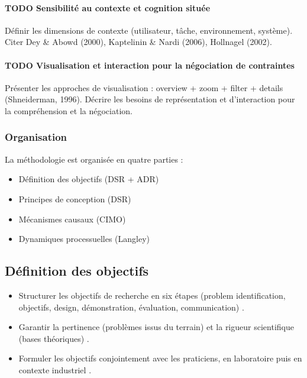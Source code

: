 \documentclass[a4paper,12pt]{article}
\begin{document}
\paragraph*{{\bfseries\sffamily TODO} Sensibilité au contexte et cognition située}
\label{sec:orgd56197d}
Définir les dimensions de contexte (utilisateur, tâche, environnement, système).  
Citer Dey \& Abowd (2000), Kaptelinin \& Nardi (2006), Hollnagel (2002).
\paragraph*{{\bfseries\sffamily TODO} Visualisation et interaction pour la négociation de contraintes}
\label{sec:orge5e48a3}
Présenter les approches de visualisation : overview + zoom + filter + details (Shneiderman, 1996).  
Décrire les besoins de représentation et d’interaction pour la compréhension et la négociation.
\subsubsection{Organisation}
\label{sec:org9f6b774}
La méthodologie est organisée en quatre parties :
\begin{itemize}
\item Définition des objectifs (DSR + ADR)
\item Principes de conception (DSR)
\item Mécanismes causaux (CIMO)
\item Dynamiques processuelles (Langley)
\end{itemize}
\subsection{Définition des objectifs}
\label{sec:orgfa7e6c6}
\begin{itemize}
\item Structurer les objectifs de recherche en six étapes (problem identification, objectifs, design, démonstration, évaluation, communication) \autocite[et al. (2007)]{Peffers}.
\item Garantir la pertinence (problèmes issus du terrain) et la rigueur scientifique (bases théoriques) \autocite[et al. (2004)]{Hevner}.
\item Formuler les objectifs conjointement avec les praticiens, en laboratoire puis en contexte industriel \autocite[et al. (2011) (ADR)]{Sein}.
\end{itemize}
\end{document}
